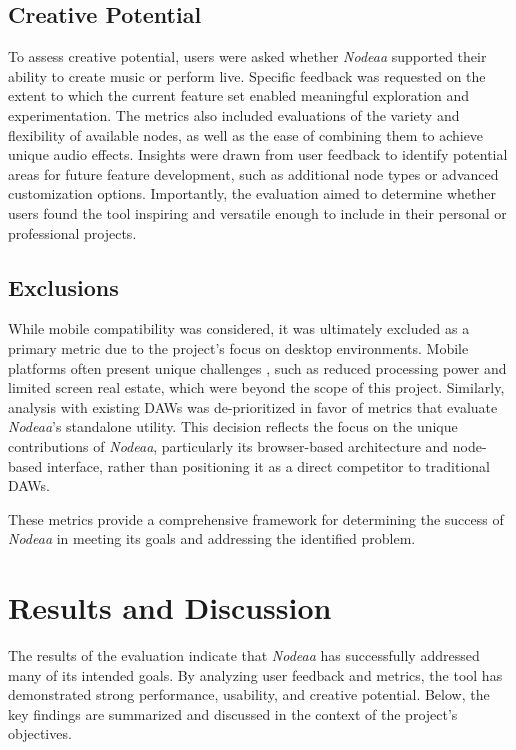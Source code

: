 \documentclass[10pt,twocolumn]{article}
\begin{document}
\subsection{Creative Potential}
To assess creative potential, users were asked whether \textit{Nodeaa} supported their ability to create music or perform live. Specific feedback was requested on the extent to which the current feature set enabled meaningful exploration and experimentation. The metrics also included evaluations of the variety and flexibility of available nodes, as well as the ease of combining them to achieve unique audio effects. Insights were drawn from user feedback to identify potential areas for future feature development, such as additional node types or advanced customization options. Importantly, the evaluation aimed to determine whether users found the tool inspiring and versatile enough to include in their personal or professional projects.

\subsection{Exclusions}
While mobile compatibility was considered, it was ultimately excluded as a primary metric due to the project’s focus on desktop environments. Mobile platforms often present unique challenges \cite{clauhs2022daw}, such as reduced processing power and limited screen real estate, which were beyond the scope of this project. Similarly, analysis with existing DAWs was de-prioritized in favor of metrics that evaluate \textit{Nodeaa}'s standalone utility. This decision reflects the focus on the unique contributions of \textit{Nodeaa}, particularly its browser-based architecture and node-based interface, rather than positioning it as a direct competitor to traditional DAWs.

These metrics provide a comprehensive framework for determining the success of \textit{Nodeaa} in meeting its goals and addressing the identified problem.

\section{Results and Discussion}

The results of the evaluation indicate that \textit{Nodeaa} has successfully addressed many of its intended goals. By analyzing user feedback and metrics, the tool has demonstrated strong performance, usability, and creative potential. Below, the key findings are summarized and discussed in the context of the project’s objectives.
\end{document}
